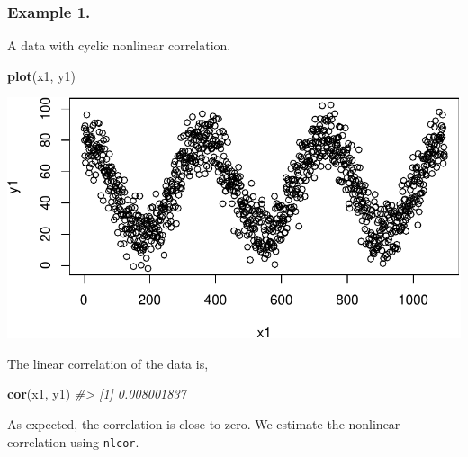 \documentclass[]{article}
\newenvironment{Shaded}{\begin{snugshade}}{\end{snugshade}}
\newcommand{\CommentTok}[1]{\textcolor[rgb]{0.56,0.35,0.01}{\textit{#1}}}
\newcommand{\DataTypeTok}[1]{\textcolor[rgb]{0.13,0.29,0.53}{#1}}
\newcommand{\KeywordTok}[1]{\textcolor[rgb]{0.13,0.29,0.53}{\textbf{#1}}}
\newcommand{\NormalTok}[1]{#1}
\newcommand{\OperatorTok}[1]{\textcolor[rgb]{0.81,0.36,0.00}{\textbf{#1}}}
\newcommand{\StringTok}[1]{\textcolor[rgb]{0.31,0.60,0.02}{#1}}
\begin{document}
\hypertarget{example-1.}{%
\subsubsection{Example 1.}\label{example-1.}}

A data with cyclic nonlinear correlation.

\begin{Shaded}
\begin{Highlighting}[]
\KeywordTok{plot}\NormalTok{(x1, y1)}
\end{Highlighting}
\end{Shaded}

\begin{center}\includegraphics{README_files/figure-latex/Figure-1.1-1} \end{center}

The linear correlation of the data is,

\begin{Shaded}
\begin{Highlighting}[]
\KeywordTok{cor}\NormalTok{(x1, y1)}
\CommentTok{#> [1] 0.008001837}
\end{Highlighting}
\end{Shaded}

As expected, the correlation is close to zero. We estimate the nonlinear
correlation using \texttt{nlcor}.

\begin{Shaded}
\end{Shaded}
\end{document}
